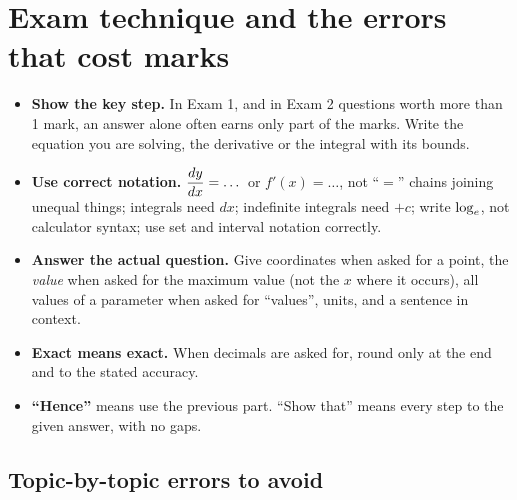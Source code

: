 \section{Exam technique and the errors that cost marks}
\label{sec:technique}

\begin{tip}
\begin{itemize}
  \item \textbf{Show the key step.} In Exam 1, and in Exam 2 questions worth more than 1 mark, an answer alone often earns only part of the marks. Write the equation you are solving, the derivative or the integral with its bounds.
  \item \textbf{Use correct notation.} $\dfrac{dy}{dx}=\dots$ or $f'(x)=\dots$, not ``$=$'' chains joining unequal things; integrals need $dx$; indefinite integrals need $+c$; write $\log_e$, not calculator syntax; use set and interval notation correctly.
  \item \textbf{Answer the actual question.} Give coordinates when asked for a point, the \emph{value} when asked for the maximum value (not the $x$ where it occurs), all values of a parameter when asked for ``values'', units, and a sentence in context.
  \item \textbf{Exact means exact.} When decimals are asked for, round only at the end and to the stated accuracy.
  \item \textbf{``Hence''} means use the previous part. ``Show that'' means every step to the given answer, with no gaps.
\end{itemize}
\end{tip}

\subsection{Topic-by-topic errors to avoid}

